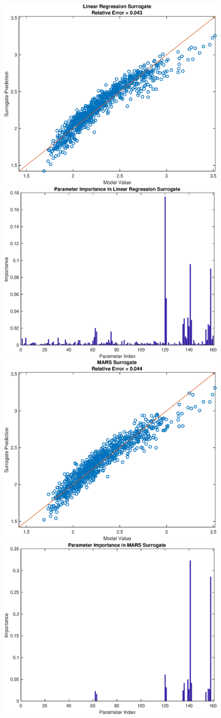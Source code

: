 \documentclass[12pt]{article}
\numberwithin{equation}{section}
\begin{document}
\begin{figure}[h]
\centering
\includegraphics[width=.49 \textwidth]{Figures/Vol_Flow_QoI_LR_Prediction_Rectangular.eps}
\includegraphics[width=.49 \textwidth]{Figures/Vol_Flow_QoI_LR_VI_Rectangular.eps}\\
\includegraphics[width=.49 \textwidth]{Figures/Vol_Flow_QoI_MARS_Prediction_Rectangular.eps}
\includegraphics[width=.49 \textwidth]{Figures/Vol_Flow_QoI_MARS_VI_Rectangular.eps}
\end{figure}
\end{document}
